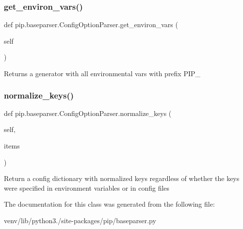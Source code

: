 \subsubsection{\texorpdfstring{get\+\_\+environ\+\_\+vars()}{get\_environ\_vars()}}
{\footnotesize\ttfamily def pip.\+baseparser.\+Config\+Option\+Parser.\+get\+\_\+environ\+\_\+vars (\begin{DoxyParamCaption}\item[{}]{self }\end{DoxyParamCaption})}

\begin{DoxyVerb}Returns a generator with all environmental vars with prefix PIP_\end{DoxyVerb}
 \mbox{\label{classpip_1_1baseparser_1_1_config_option_parser_a69d71a377015a9faa50da36fef01d313}} 
\subsubsection{\texorpdfstring{normalize\+\_\+keys()}{normalize\_keys()}}
{\footnotesize\ttfamily def pip.\+baseparser.\+Config\+Option\+Parser.\+normalize\+\_\+keys (\begin{DoxyParamCaption}\item[{}]{self,  }\item[{}]{items }\end{DoxyParamCaption})}

\begin{DoxyVerb}Return a config dictionary with normalized keys regardless of
whether the keys were specified in environment variables or in config
files\end{DoxyVerb}
 

The documentation for this class was generated from the following file\+:\begin{DoxyCompactItemize}
\item 
venv/lib/python3./site-\/packages/pip/baseparser.\+py\end{DoxyCompactItemize}
